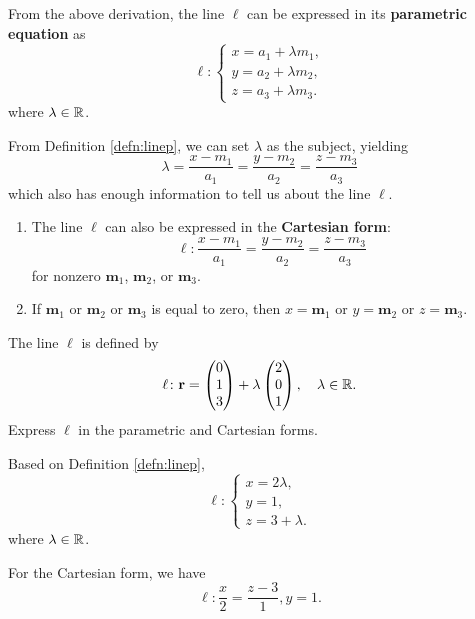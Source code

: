 \documentclass[12pt]{article}
\renewcommand{\vec}{\mathbf}
\begin{document}
\begin{defn} \label{defn:linep}
	From the above derivation, the line \(\ell\) can be expressed in its \textbf{parametric equation} as
	\[ \ell \colon 
	\begin{cases}
		x = a_1 + \lambda m_1, \\
		y = a_2 + \lambda m_2, \\
		z = a_3 + \lambda m_3.
	\end{cases}\] 
	where \(\lambda \in \mathbb{R}\).
\end{defn}
From Definition \ref{defn:linep}, we can set \(\lambda\) as the subject, yielding
\[ \lambda = \frac{x - m_1}{a_1} = \frac{y - m_2}{a_2} = \frac{z - m_3}{a_3} \] 
which also has enough information to tell us about the line \(\ell\).
\begin{defn}
	\begin{enumerate}
		\item The line \(\ell\) can also be expressed in the \textbf{Cartesian form}:
		\[ \ell \colon \frac{x - m_1}{a_1} = \frac{y - m_2}{a_2} = \frac{z - m_3}{a_3} \] 
		for nonzero \(\vec{m}_1\), \(\vec{m}_2\), or \(\vec{m}_3\).
		\item If \(\vec{m}_1\) or \(\vec{m}_2\) or \(\vec{m}_3\) is equal to zero, then \(x = \vec{m}_1\) or \(y = \vec{m}_2\) or \(z = \vec{m}_3\).
	\end{enumerate}
\end{defn}

\begin{eg}
	The line \(\ell\) is defined by
	\[ \ell \colon \vec{r} = \cvec{0 \\ 1 \\ 3} + \lambda \cvec{2 \\ 0 \\ 1}, \quad \lambda \in \R. \]
	Express \(\ell\) in the parametric and Cartesian forms.
	\begin{soln}
		Based on Definition \ref{defn:linep}, 
		\[ \ell \colon 
		\begin{cases}
			x = 2 \lambda, \\
			y = 1, \\
			z = 3 + \lambda.
		\end{cases}\] 
		where \(\lambda \in \mathbb{R}\).

		For the Cartesian form, we have
		\[ \ell \colon \frac{x}{2} = \frac{z - 3}{1}, y = 1. \] 
	\end{soln}
\end{eg}
\end{document}
